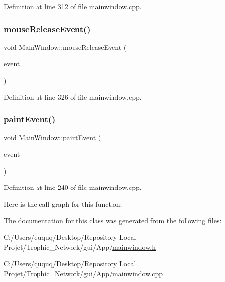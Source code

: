 Definition at line 312 of file mainwindow.\+cpp.

\mbox{\label{class_main_window_a32bbb036a55856e49c31a5348f937b53}} 
\subsubsection{\texorpdfstring{mouse\+Release\+Event()}{mouseReleaseEvent()}}
{\footnotesize\ttfamily void Main\+Window\+::mouse\+Release\+Event (\begin{DoxyParamCaption}\item[{Q\+Mouse\+Event $\ast$}]{event }\end{DoxyParamCaption})\hspace{0.3cm}{\ttfamily [protected]}}



Definition at line 326 of file mainwindow.\+cpp.

\mbox{\label{class_main_window_abf05d580e91f725777cdb6a5eb0bf08c}} 
\subsubsection{\texorpdfstring{paint\+Event()}{paintEvent()}}
{\footnotesize\ttfamily void Main\+Window\+::paint\+Event (\begin{DoxyParamCaption}\item[{Q\+Paint\+Event $\ast$}]{event }\end{DoxyParamCaption})\hspace{0.3cm}{\ttfamily [protected]}}



Definition at line 240 of file mainwindow.\+cpp.

Here is the call graph for this function\+:


The documentation for this class was generated from the following files\+:\begin{DoxyCompactItemize}
\item 
C\+:/\+Users/ququq/\+Desktop/\+Repository Local Projet/\+Trophic\+\_\+\+Network/gui/\+App/\mbox{\hyperlink{mainwindow_8h}{mainwindow.\+h}}\item 
C\+:/\+Users/ququq/\+Desktop/\+Repository Local Projet/\+Trophic\+\_\+\+Network/gui/\+App/\mbox{\hyperlink{mainwindow_8cpp}{mainwindow.\+cpp}}\end{DoxyCompactItemize}
